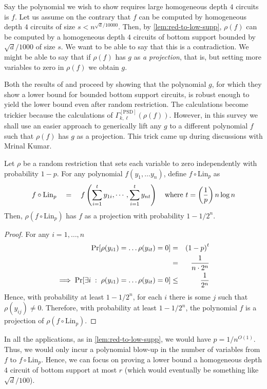 Say the polynomial we wish to show requires large homogeneous depth $4$ circuits is $f$. Let us assume on the contrary that $f$ can be computed by homogeneous depth $4$ circuits of size $s < n^{\sqrt{d}/10000}$. Then, by \autoref{lem:red-to-low-supp}, $\rho(f)$ can be computed by a homogeneous depth $4$ circuits of bottom support bounded by $\sqrt{d}/1000$ of size $s$. We want to be able to say that this is a contradiction. We might be able to say that if $\rho(f)$ has $g$ as \emph{a projection}, that is, but setting more variables to zero in $\rho(f)$ we obtain $g$. 

Both the results of \cite{KLSS} and \cite{KS14} proceed by showing that the polynomial $g$, for which they show a lower bound for bounded bottom support circuits, is robust enough to yield the lower bound even after random restriction. The calculations become trickier because the calculations of $\Gamma^{[\mathrm{PSD}]}_{k,\ell}(\rho(f))$. However, in this survey we shall use an easier approach to generically lift any $g$ to a different polynomial $f$ such that $\rho(f)$ has $g$ as a projection. This trick came up during discussions with Mrinal Kumar. 

\begin{lemma}\label{lem:lin-transform-trick}
Let $\rho$ be a random restriction that sets each variable to zero independently with probability $1 - p$. For any polynomial $f(y_1,\dots y_n)$, define $f \circ \mathrm{Lin}_p$ as
\[
f \circ \mathrm{Lin}_p \quad = \quad f\left(\sum_{i=1}^t y_{1i}, \cdots, \sum_{i=1}^t y_{nt}\right)\quad \text{where $t = \left(\frac{1}{p}\right) n \log n$}
\]
Then, $\rho(f \circ \mathrm{Lin}_p)$ has $f$ as a projection with probability $1 - 1/2^{n}$. 
\end{lemma}
\begin{proof} For any $i = 1, \dots, n$
\begin{eqnarray*}
\quad \Pr[\rho(y_{i1}) = \dots \rho(y_{it}) = 0 ] & = & \left(1 - p\right)^t\\ 
& = & \frac{1}{n\cdot 2^n}\\
\implies \Pr[\exists i\;:\;\rho(y_{i1}) = \dots \rho(y_{it}) = 0 ]  & \leq  & \frac{1}{2^n} 
\end{eqnarray*}
Hence, with probability at least $1 - 1/2^n$, for each $i$ there is some $j$ such that $\rho(y_{ij}) \neq 0$. Therefore, with probability at least $1 - 1/2^n$, the polynomial $f$ is a projection of $\rho(f \circ \mathrm{Lin}_p)$. \end{proof}

In all the applications, as in \autoref{lem:red-to-low-supp}, we would have $p = 1/n^{O(1)}$. Thus, we would only incur a polynomial blow-up in the number of variables from $f$ to $f\circ \mathrm{Lin}_p$. Hence, we can focus on proving a lower bound  a homogeneous depth $4$ circuit of bottom support at most $r$ (which would eventually be something like $\sqrt{d}/100$). 

